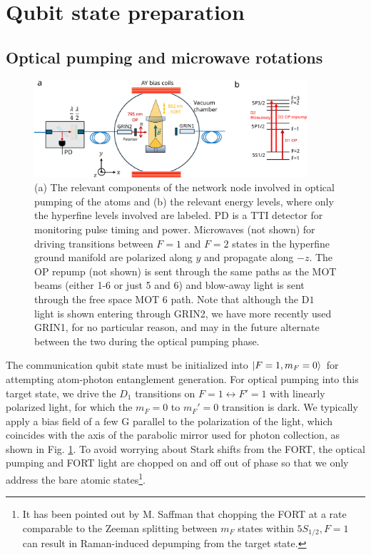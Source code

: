 \section{Qubit state preparation}

\subsection{Optical pumping and microwave rotations}

\begin{figure}[!h]
    \centering
    \includegraphics[width=0.9\textwidth]{Images/OP_setup.pdf}
    \caption{(a) The relevant components of the network node involved in optical pumping of the atoms and (b) the relevant energy levels, where only the hyperfine levels involved are labeled. PD is a TTI detector for monitoring pulse timing and power. Microwaves (not shown) for driving transitions between $F=1$ and $F=2$ states in the hyperfine ground manifold are polarized along $y$ and propagate along $-z$. The OP repump (not shown) is sent through the same paths as the MOT beams (either 1-6 or just 5 and 6) and blow-away light is sent through the free space MOT 6 path. Note that although the $\mathrm{D}1$ light is shown entering through GRIN2, we have more recently used GRIN1, for no particular reason, and may in the future alternate between the two during the optical pumping phase.}
    \label{fig:op_setup}
\end{figure}

The communication qubit state must be initialized into $\ket{F=1,m_F=0}$ for attempting
atom-photon entanglement generation. For optical pumping into this target state, we drive the $D_1$ transitions on $F=1 \leftrightarrow F'=1$ with linearly polarized light, for which the $m_F=0$ to $m_F'=0$ transition is dark. We typically apply a bias field of a few G parallel to the polarization of the light, which coincides with the axis of the parabolic mirror used for photon collection, as shown in Fig. \ref{fig:op_setup}. To avoid worrying about Stark shifts from the FORT, the optical pumping and FORT light are chopped on and off out of phase so that we only address the bare atomic states\footnote{It has been pointed out by M. Saffman that chopping the FORT at a rate comparable to the Zeeman splitting between $m_F$ states within $5S_{1/2},F=1$ can result in Raman-induced depumping from the target state.}.

